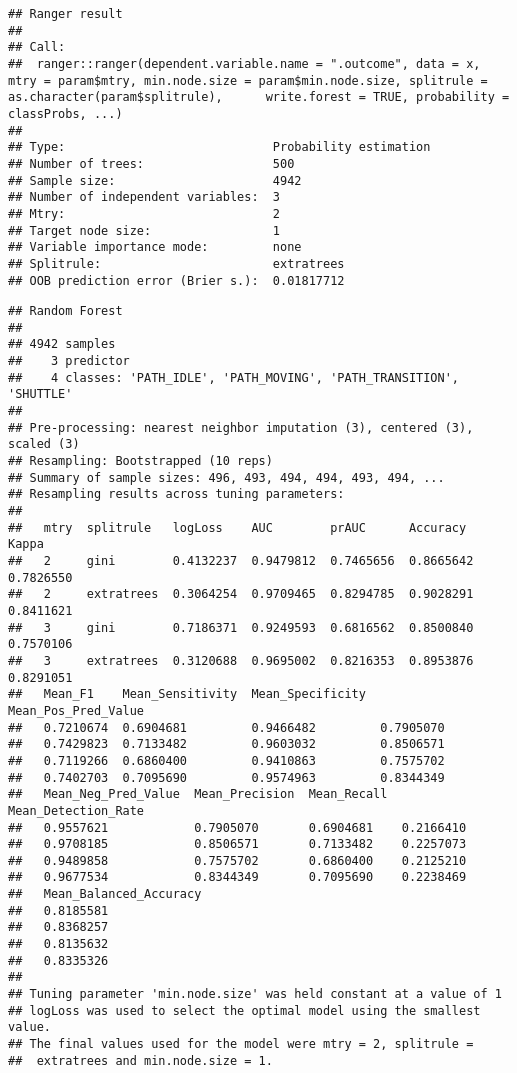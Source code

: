 \documentclass[]{article}
\begin{document}
\begin{verbatim}
## Ranger result
## 
## Call:
##  ranger::ranger(dependent.variable.name = ".outcome", data = x,      mtry = param$mtry, min.node.size = param$min.node.size, splitrule = as.character(param$splitrule),      write.forest = TRUE, probability = classProbs, ...) 
## 
## Type:                             Probability estimation 
## Number of trees:                  500 
## Sample size:                      4942 
## Number of independent variables:  3 
## Mtry:                             2 
## Target node size:                 1 
## Variable importance mode:         none 
## Splitrule:                        extratrees 
## OOB prediction error (Brier s.):  0.01817712
\end{verbatim}

\begin{verbatim}
## Random Forest 
## 
## 4942 samples
##    3 predictor
##    4 classes: 'PATH_IDLE', 'PATH_MOVING', 'PATH_TRANSITION', 'SHUTTLE' 
## 
## Pre-processing: nearest neighbor imputation (3), centered (3), scaled (3) 
## Resampling: Bootstrapped (10 reps) 
## Summary of sample sizes: 496, 493, 494, 494, 493, 494, ... 
## Resampling results across tuning parameters:
## 
##   mtry  splitrule   logLoss    AUC        prAUC      Accuracy   Kappa    
##   2     gini        0.4132237  0.9479812  0.7465656  0.8665642  0.7826550
##   2     extratrees  0.3064254  0.9709465  0.8294785  0.9028291  0.8411621
##   3     gini        0.7186371  0.9249593  0.6816562  0.8500840  0.7570106
##   3     extratrees  0.3120688  0.9695002  0.8216353  0.8953876  0.8291051
##   Mean_F1    Mean_Sensitivity  Mean_Specificity  Mean_Pos_Pred_Value
##   0.7210674  0.6904681         0.9466482         0.7905070          
##   0.7429823  0.7133482         0.9603032         0.8506571          
##   0.7119266  0.6860400         0.9410863         0.7575702          
##   0.7402703  0.7095690         0.9574963         0.8344349          
##   Mean_Neg_Pred_Value  Mean_Precision  Mean_Recall  Mean_Detection_Rate
##   0.9557621            0.7905070       0.6904681    0.2166410          
##   0.9708185            0.8506571       0.7133482    0.2257073          
##   0.9489858            0.7575702       0.6860400    0.2125210          
##   0.9677534            0.8344349       0.7095690    0.2238469          
##   Mean_Balanced_Accuracy
##   0.8185581             
##   0.8368257             
##   0.8135632             
##   0.8335326             
## 
## Tuning parameter 'min.node.size' was held constant at a value of 1
## logLoss was used to select the optimal model using the smallest value.
## The final values used for the model were mtry = 2, splitrule =
##  extratrees and min.node.size = 1.
\end{verbatim}
\end{document}
